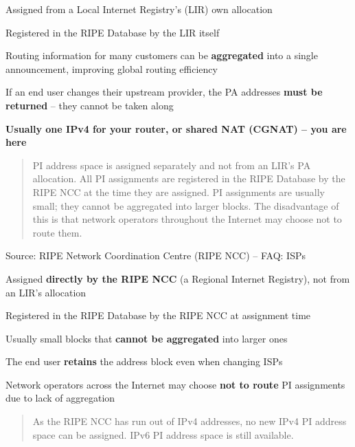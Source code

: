 \documentclass[Screen16to9,17pt]{foils}
\begin{document}
\begin{list2}
\item Assigned from a Local Internet Registry's (LIR) own allocation
\item Registered in the RIPE Database by the LIR itself
\item Routing information for many customers can be {\bf aggregated} into a single announcement, improving global routing efficiency
\item If an end user changes their upstream provider, the PA addresses {\bf must be returned} -- they cannot be taken along
\item {\bf Usually one IPv4 for your router, or shared NAT (CGNAT) -- you are here}
\end{list2}


\begin{quote}
PI address space is assigned separately and not from an LIR's PA allocation. All PI
assignments are registered in the RIPE Database by the RIPE NCC at the time they are
assigned. PI assignments are usually small; they cannot be aggregated into larger blocks.
The disadvantage of this is that network operators throughout the Internet may choose
not to route them.
\end{quote}
Source: RIPE Network Coordination Centre (RIPE NCC) -- FAQ: ISPs\\

\begin{list2}
  \item Assigned {\bf directly by the RIPE NCC} (a Regional Internet Registry),
        not from an LIR's allocation
  \item Registered in the RIPE Database by the RIPE NCC at assignment time
  \item Usually small blocks that {\bf cannot be aggregated} into larger ones
  \item The end user {\bf retains} the address block even when changing ISPs
  \item Network operators across the Internet may choose {\bf not to route} PI
        assignments due to lack of aggregation
\end{list2}


\begin{quote}
As the RIPE NCC has run out of IPv4 addresses, no new IPv4 PI address space can be
assigned. IPv6 PI address space is still available.
\end{quote}
\end{document}
